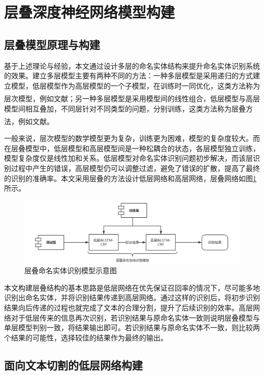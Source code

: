 \documentclass[winfonts,master,oneside,nobackinfo]{njuthesis}
\newcommand{\upcite}[1]{\textsuperscript{\textsuperscript{\cite{#1}}}}
\begin{document}
\section{层叠深度神经网络模型构建}

\subsection{层叠模型原理与构建}

基于上述理论与经验，本文通过设计多层的命名实体结构来提升命名实体识别系统的效果。建立多层模型主要有两种不同的方法：一种多层模型是采用递归的方式建立模型，低层模型作为高层模型的一个子模型，在训练时一同优化，这类方法称为层次模型，例如文献\upcite{taobao}；另一种多层模型是采用模型间的线性组合，低层模型与高层模型间相互叠加，不同层针对不同类型的问题，分别训练，这类方法称为层叠方法，例如文献\upcite{Yixue,Jia}。

一般来说，层次模型的数学模型更为复杂，训练更为困难，模型的复杂度较大。而在层叠模型中，低层模型和高层模型间是一种松耦合的状态，各层模型独立训练，模型复杂度仅是线性加和关系。低层模型对命名实体识别问题初步解决，而该层识别过程中产生的错误，高层模型仍可以调整过滤，避免了错误的扩散，提高了最终的识别的准确率。本文采用层叠的方法设计低层网络和高层网络，层叠网络如图\ref{casecaed-model}所示。

\begin{figure}[H]
\centering
\includegraphics[width=1\textwidth]{./figure/层叠模型.jpg}
\caption{层叠命名实体识别模型示意图}
\label{casecaed-model}
\end{figure}

本文构建层叠结构的基本思路是低层网络在优先保证召回率的情况下，尽可能多地识别出命名实体，并将识别结果传递到高层网络。通过这样的识别后，将初步识别结果向后传递的过程也就完成了文本的合理分割，提升了后续识别的效率。高层网络对于低层传来的信息再次识别，若识别结果与原命名实体一致则说明层叠模型与单层模型判别一致，将结果输出即可。若识别结果与原命名实体不一致，则比较两个结果的可能性，选择较佳的结果作为最终的输出。

\subsection{面向文本切割的低层网络构建}
\end{document}
